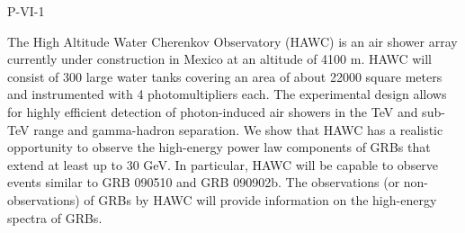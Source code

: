 P-VI-1


\bigskip



\bigskip

\noindent The High Altitude Water Cherenkov Observatory (HAWC) is an air shower array currently under construction in Mexico at an altitude of 4100 m. HAWC will consist of 300 large water tanks covering an area of about 22000 square meters and instrumented with 4 photomultipliers each. The experimental design allows for highly efficient detection of photon-induced air showers in the TeV and sub-TeV range and gamma-hadron separation. We show that HAWC has a realistic opportunity to observe the high-energy power law components of GRBs that extend at least up to 30 GeV. In particular, HAWC will be capable to observe events similar to GRB 090510 and GRB 090902b. The observations (or non-observations) of GRBs by HAWC will provide information on the high-energy spectra of GRBs.

